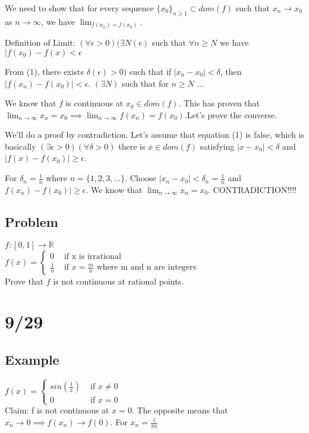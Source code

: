 \documentclass[11pt]{article}
\begin{document}
	We need to show that for every sequence $\{x_0\}_{n \ge 1} \subset dom(f)$ such that $x_n \to x_0$ as $n \to \infty$, we have $\lim_{f(x_n) = f(x_0)}$.

	Definition of Limit: $(\forall \epsilon > 0)(\exists N(\epsilon)$ such that
	$\forall n \ge N$ we have $|f(x_0) - f(x) < \epsilon$

	From (1), there exists $\delta(\epsilon) > 0)$ such that if $|x_n - x_0| < \delta$, then $|f(x_n) - f(x_0)| < \epsilon$. $(\exists N)$ such that for $n \ge N$ ...

	We know that $f$ is continuous at $x_0 \in dom(f)$. This has proven that $\lim_{n \to \infty}{x_n} = x_0 \implies \lim_{n \to \infty}{f(x_n)} = f(x_0)$.Let's prove the converse. 
	
	We'll do a proof by contradiction. Let's assume that equation (1) is false,
	which is basically $(\exists \epsilon > 0)(\forall \delta > 0)$ there is $x \in dom(f)$
	satisfying $| x - x_0 | < \delta $ and $|f(x) - f(x_0)| \ge \epsilon$. 

	For $\delta_n = \frac{1}{n}$ where $n = \{ 1, 2, 3, . . . \}$.
	Choose $|x_n - x_0| < \delta_n = \frac{1}{n}$ and $f(x_n) - f(x_0)| \ge \epsilon$. We know that $\lim_{n \to \infty}{x_n} = x_0$. CONTRADICTION!!!!

\subsection*{Problem}
	$f: [0, 1] \to \mathbb{R}$\\
	$f(x) = \begin{cases} 0 & \text{ if x is irrational}\\
	\frac{1}{n} & \text{ if $x = \frac{m}{n}$ where m and n are integers}\end{cases}$\\

	Prove that $f$ is not continuous at rational points.

\section*{9/29}
	\subsection*{Example}
		$f(x) = \begin{cases} sin(\frac{1}{x}) & \text{ if } x \not= 0 \\
						0 & \text{ if } x = 0 \end{cases}$\\
		Claim: f is not continuous at $x = 0$. The opposite means that $x_n \to 
		0 \implies f(x_n) \to f(0)$. For $x_n = \frac{1}{\pi n}$
\end{document}
